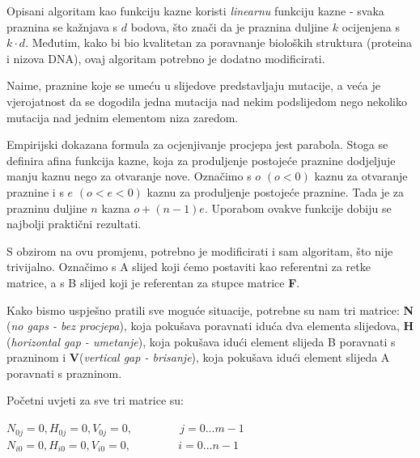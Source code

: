 \documentclass[times, utf8, zavrsni, numeric]{fer}
\begin{document}
Opisani algoritam kao funkciju kazne koristi \emph{linearnu} funkciju kazne - svaka praznina se kažnjava s $d$ bodova, što znači da je praznina duljine $k$ ocijenjena s $k\cdot d$. Međutim, kako bi bio kvalitetan za poravnanje bioloških struktura (proteina i nizova DNA), ovaj algoritam potrebno je dodatno modificirati.

Naime, praznine koje se umeću u slijedove predstavljaju mutacije, a veća je vjerojatnost da se dogodila jedna mutacija nad nekim podslijedom nego nekoliko mutacija nad jednim elementom niza zaredom.

Empirijski dokazana formula za ocjenjivanje procjepa jest parabola. Stoga se definira afina funkcija kazne, koja za produljenje postojeće praznine dodjeljuje manju kaznu nego za otvaranje nove. Označimo s $o$ $(o < 0)$ kaznu za otvaranje praznine i s $e$ $(o < e < 0)$ kaznu za produljenje postojeće praznine. Tada je za prazninu duljine $n$ kazna  $o + (n - 1)e$. Uporabom ovakve funkcije dobiju se najbolji praktični rezultati.\cite{gapopen}

S obzirom na ovu promjenu, potrebno je modificirati i sam algoritam, što nije trivijalno. Označimo s A slijed koji ćemo postaviti kao referentni za retke matrice, a s B slijed koji je referentan za stupce matrice \textbf{F}.

Kako bismo uspješno pratili sve moguće situacije, potrebne su nam tri matrice: \textbf{N} (\emph{no gaps - bez procjepa}), koja pokušava poravnati iduća dva elementa slijedova, \textbf{H} (\emph{horizontal gap - umetanje}), koja pokušava idući element slijeda B poravnati s prazninom i \textbf{V}(\emph{vertical gap - brisanje}), koja pokušava idući element slijeda A poravnati s prazninom.

Početni uvjeti za sve tri matrice su:
\begin{center}
$N_{0j} = 0, H_{0j} = 0, V_{0j} = 0,\hspace{50pt} j = 0...m-1$\\
$N_{i0} = 0, H_{i0} = 0, V_{i0} = 0,\hspace{50pt} i = 0...n-1$
\end{center}
\end{document}
